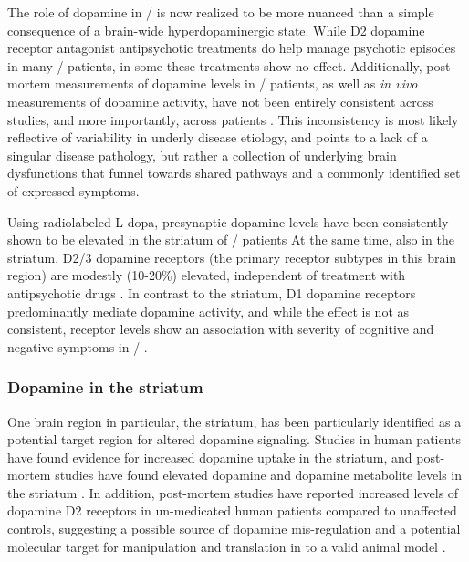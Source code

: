 The role of dopamine in \scz/ is now realized to be more nuanced than a simple consequence of a brain-wide hyperdopaminergic state.
While D2 dopamine receptor antagonist antipsychotic treatments do help manage psychotic episodes in many \scz/ patients, in some these treatments show no effect.
Additionally, post-mortem measurements of dopamine levels in \scz/ patients, as well as \emph{in vivo} measurements of dopamine activity, have not been entirely consistent across studies, and more importantly, across patients \citep{XXXX}.
This inconsistency is most likely reflective of variability in underly disease etiology, and points to a lack of a singular disease pathology, but rather a collection of underlying brain dysfunctions that funnel towards shared pathways and a commonly identified set of expressed symptoms.

Using radiolabeled L-dopa, presynaptic dopamine levels have been consistently shown to be elevated in the striatum of \scz/ patients \citep[for review, see][]{Howes2007}
At the same time, also in the striatum, D2/3 dopamine receptors (the primary receptor subtypes in this brain region) are modestly (10-20\%) elevated, independent of treatment with antipsychotic drugs \citep[for review, see][]{Howes2009}.
In contrast to the striatum, D1 dopamine receptors predominantly mediate dopamine activity, and while the effect is not as consistent, receptor levels show an association with severity of cognitive and negative symptoms in \scz/ \citep{Goldman-Rakic2004}.

\subsubsection{Dopamine in the striatum}
One brain region in particular, the striatum, has been particularly identified as a potential target region for altered dopamine signaling. Studies in human patients have found evidence for increased dopamine uptake in the striatum, and post-mortem studies have found elevated dopamine and dopamine metabolite levels in the striatum \citep{Simpson2010}.
In addition, post-mortem studies have reported increased levels of dopamine D2 receptors in un-medicated human patients compared to unaffected controls, suggesting a possible source of dopamine mis-regulation and a potential molecular target for manipulation and translation in to a valid animal model \citep{XXXX}.


